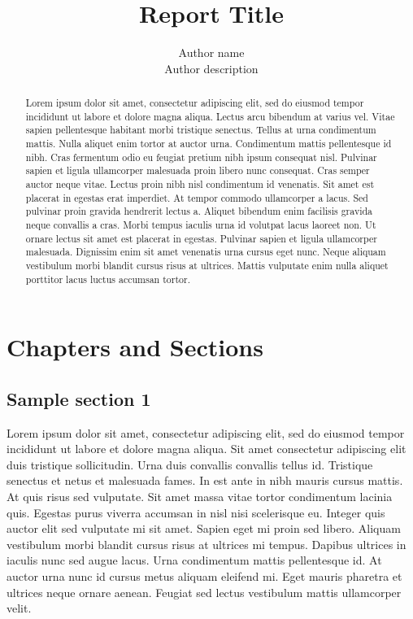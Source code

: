 \documentclass[a4paper, 12pt]{report}
\title{Report Title}
\author{Author name\\ Author description}
\begin{document}
\maketitle
\thispagestyle{empty}
\newpage

\begin{abstract}
Lorem ipsum dolor sit amet, consectetur adipiscing elit, sed do eiusmod tempor incididunt ut labore et dolore magna aliqua. Lectus arcu bibendum at varius vel. Vitae sapien pellentesque habitant morbi tristique senectus. Tellus at urna condimentum mattis. Nulla aliquet enim tortor at auctor urna. Condimentum mattis pellentesque id nibh. Cras fermentum odio eu feugiat pretium nibh ipsum consequat nisl. Pulvinar sapien et ligula ullamcorper malesuada proin libero nunc consequat. Cras semper auctor neque vitae. Lectus proin nibh nisl condimentum id venenatis. Sit amet est placerat in egestas erat imperdiet. At tempor commodo ullamcorper a lacus. Sed pulvinar proin gravida hendrerit lectus a. Aliquet bibendum enim facilisis gravida neque convallis a cras. Morbi tempus iaculis urna id volutpat lacus laoreet non. Ut ornare lectus sit amet est placerat in egestas. Pulvinar sapien et ligula ullamcorper malesuada. Dignissim enim sit amet venenatis urna cursus eget nunc. Neque aliquam vestibulum morbi blandit cursus risus at ultrices. Mattis vulputate enim nulla aliquet porttitor lacus luctus accumsan tortor.
\end{abstract}

\tableofcontents

\listoffigures

\listoftables

\lstlistoflistings

\newpage
\printglossary[type=\acronymtype]



\chapter{Chapters and Sections}
\section{Sample section 1}
Lorem ipsum dolor sit amet, consectetur adipiscing elit, sed do eiusmod tempor incididunt ut labore et dolore magna aliqua. Sit amet consectetur adipiscing elit duis tristique sollicitudin. Urna duis convallis convallis tellus id. Tristique senectus et netus et malesuada fames. In est ante in nibh mauris cursus mattis. At quis risus sed vulputate. Sit amet massa vitae tortor condimentum lacinia quis. Egestas purus viverra accumsan in nisl nisi scelerisque eu. Integer quis auctor elit sed vulputate mi sit amet. Sapien eget mi proin sed libero. Aliquam vestibulum morbi blandit cursus risus at ultrices mi tempus. Dapibus ultrices in iaculis nunc sed augue lacus. Urna condimentum mattis pellentesque id. At auctor urna nunc id cursus metus aliquam eleifend mi. Eget mauris pharetra et ultrices neque ornare aenean. Feugiat sed lectus vestibulum mattis ullamcorper velit.
\end{document}

